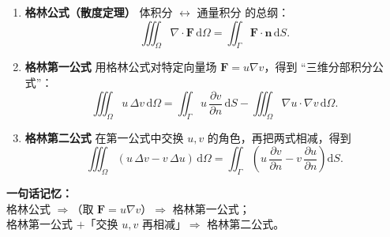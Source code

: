 \begin{note}

\begin{enumerate}
  \item \textbf{格林公式（散度定理）}  
  体积分 $\leftrightarrow$ 通量积分 的总纲：  
  \[
  \iiint_{\Omega} \nabla\!\cdot\!\mathbf F\,\mathrm d\Omega
  = \iint_{\Gamma} \mathbf F\cdot\bm n\,\mathrm dS.
  \]

  \item \textbf{格林第一公式}  
  用格林公式对特定向量场 $\mathbf F = u\nabla v$，得到
  “三维分部积分公式”：  
  \[
  \iiint_{\Omega} u\,\Delta v\,\mathrm d\Omega
  = \iint_{\Gamma} u\,\frac{\partial v}{\partial n}\,\mathrm dS
    - \iiint_{\Omega} \nabla u\cdot\nabla v\,\mathrm d\Omega.
  \]

  \item \textbf{格林第二公式}  
  在第一公式中交换 $u,v$ 的角色，再把两式相减，得到  
  \[
  \iiint_{\Omega} (u\,\Delta v - v\,\Delta u)\,\mathrm d\Omega
  = \iint_{\Gamma}
    \left(
      u\,\frac{\partial v}{\partial n}
      - v\,\frac{\partial u}{\partial n}
    \right)\mathrm dS.
  \]
\end{enumerate}

\medskip
\noindent\textbf{一句话记忆：}\\
格林公式 $\Rightarrow$（取 $\mathbf F=u\nabla v$）$\Rightarrow$ 格林第一公式；\\
格林第一公式 $+$「交换 $u,v$ 再相减」$\Rightarrow$ 格林第二公式。

\end{note}


